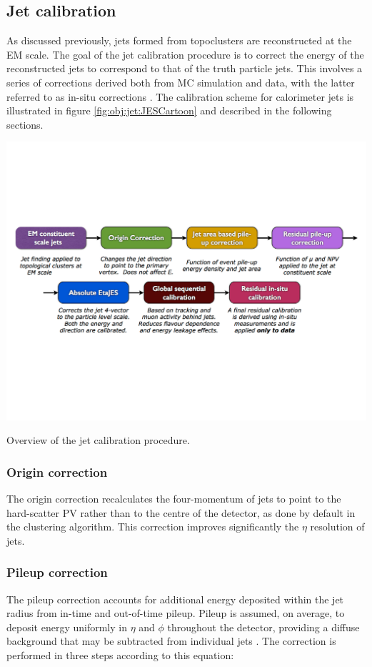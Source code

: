 \subsection{Jet calibration}
As discussed previously, jets formed from topoclusters are reconstructed at the EM scale. The goal of the jet calibration procedure is to correct the energy of the reconstructed jets to correspond to that of the truth particle jets. This involves a series of corrections derived both from MC simulation and data, with the latter referred to as in-situ corrections \cite{ATLAS-CONF-2015-037}. The calibration scheme for calorimeter jets is illustrated in figure \ref{fig:obj:jet:JESCartoon} and described in the following sections.

\bfig[h!]
\includegraphics[width=\textwidth]{figures/Objects/JES_Cartoon.pdf}
\captionsetup{width=0.85\textwidth} \caption{\small Overview of the jet calibration procedure.}
\label{fig:obj:jet:JESCartoon}
\efig

\subsubsection{Origin correction}
The origin correction recalculates the four-momentum of jets to point to the hard-scatter PV rather than to the centre of the detector, as done by default in the clustering algorithm. This correction improves significantly the $\eta$ resolution of jets.

\subsubsection{Pileup correction}
The pileup correction accounts for additional energy deposited within the jet radius from in-time and out-of-time pileup. Pileup is assumed, on average, to deposit energy uniformly in $\eta$ and $\phi$ throughout the detector, providing a diffuse background that may be subtracted from individual jets \cite{TheATLAScollaboration:2013pia}.
The correction is performed in three steps according to this equation:

